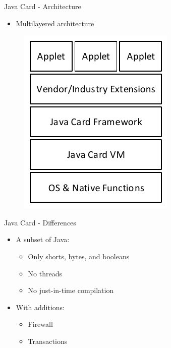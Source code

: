 \begin{frame}{Java Card - Architecture}
\begin{itemize}
\item Multilayered architecture
\end{itemize}
\begin{figure}[h]
  \centering
  \includegraphics[scale=.7]{Architecture}
\end{figure}
\end{frame}

\begin{frame}{Java Card - Differences}
\begin{itemize}
\item A subset of Java:
  \begin{itemize}
  \item Only shorts, bytes, and booleans
  \item No threads
  \item No just-in-time compilation
  \end{itemize}
\item With additions:
  \begin{itemize}
  \item Firewall
  \item Transactions
  \end{itemize}
\end{itemize}
\end{frame}


